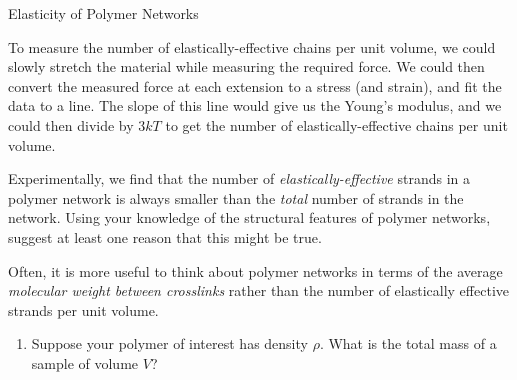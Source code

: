 \begin{activity}{Elasticity of Polymer Networks}
\begin{ctqs}
\begin{solution}[1.75in]
			To measure the number of elastically-effective chains per unit volume, we could slowly stretch the material while measuring the required force.  We could then convert the measured force at each extension to a stress (and strain), and fit the data to a line.  The slope of this line would give us the Young's modulus, and we could then divide by $3kT$ to get the number of elastically-effective chains per unit volume.
		
		\end{solution}
\end{ctqs}


\begin{exercises}

	\exercise Experimentally, we find that the number of \emph{elastically-effective} strands in a polymer network is always smaller than the \emph{total} number of strands in the network.  Using your knowledge of the structural features of polymer networks, suggest at least one reason that this might be true.
	
		\begin{solution}
		\end{solution}
	
	
	
	
	\exercise Often, it is more useful to think about polymer networks in terms of the average \emph{molecular weight between crosslinks} rather than the number of elastically effective strands per unit volume.
	
		\begin{enumerate}
			\item Suppose your polymer of interest has density $\rho$.  What is the total mass of a sample of volume $V$?
			
				\begin{solution}
					\instructordisplay{$\rho V$}
				\end{solution}
			

\end{enumerate}
\end{exercises}
\end{activity}
